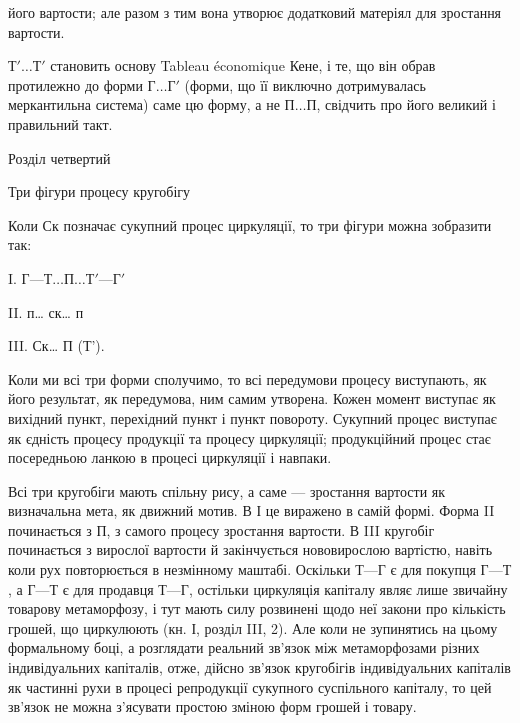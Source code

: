 \parcont{}  %
його вартости; але разом з тим вона утворює додатковий матеріял для
зростання вартости.

$Т'\dots{} Т'$ становить основу Tableau économique Кене, і те, що він
обрав протилежно до форми $Г\dots{} Г'$ (форми, що її виключно дотримувалась
меркантильна система) саме цю форму, а не $П\dots{} П$, свідчить про
його великий і правильний такт.

Розділ четвертий

Три фігури процесу кругобігу

Коли Ск позначає сукупний процес циркуляції, то три фігури можна
зобразити так:

I. $Г — Т\dots{} П\dots{} Т' — Г'$

II. п\dots{} ск\dots{} п

III. Ск\dots{} П (Т').

Коли ми всі три форми сполучимо, то всі передумови процесу виступають,
як його результат, як передумова, ним самим утворена. Кожен
момент виступає як вихідний пункт, перехідний пункт і пункт повороту.
Сукупний процес виступає як єдність процесу продукції та процесу
циркуляції; продукційний процес стає посередньою ланкою в процесі
циркуляції і навпаки.

Всі три кругобіги мають спільну рису, а саме — зростання вартости як
визначальна мета, як движний мотив. В І це виражено в самій формі.
Форма II починається з П, з самого процесу зростання вартости.
В III кругобіг починається з вирослої вартости й закінчується нововирослою
вартістю, навіть коли рух повторюється в незмінному маштабі.
Оскільки $Т — Г$ є для покупця $Г — Т$, а $Г — Т$ є для продавця $Т — Г$,
остільки циркуляція капіталу являє лише звичайну товарову метаморфозу,
і тут мають силу розвинені щодо неї закони про кількість грошей, що
циркулюють (кн. І, розділ III, 2). Але коли не зупинятись на цьому
формальному боці, а розглядати реальний зв’язок між метаморфозами
різних індивідуальних капіталів, отже, дійсно зв’язок кругобігів індивідуальних
капіталів як частинні рухи в процесі репродукції сукупного
суспільного капіталу, то цей зв’язок не можна з’ясувати простою зміною
форм грошей і товару.

